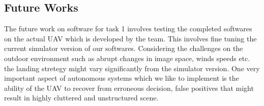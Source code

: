 \documentclass{standalone}
\begin{document}
\subsection{Future Works}
The future work on software for task 1 involves testing the completed softwares on the actual UAV which is developed by the team. This involves fine tuning the current simulator version of our softwares. Considering the challenges on the outdoor environment such as abrupt changes in image space, winds speeds etc. the landing stretegy might vary significantly from the simulator version. One very important aspect of autonomous systems which we like to implement is the ability of the UAV to recover from erroneous decision, false positives that might result in highly cluttered and unstructured scene.

\end{document}
